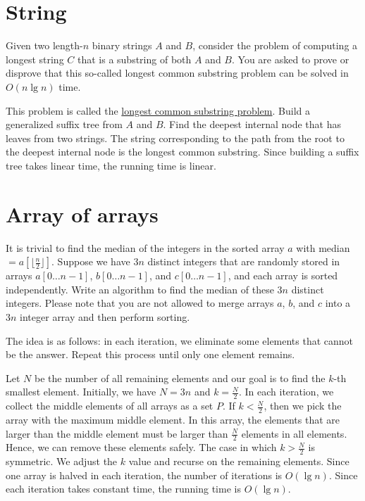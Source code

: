 \section{String}
\begin{Exercise}[origin={NTU CSIE 97},difficulty=1]
Given two length-$n$ binary strings $A$ and $B$, consider the problem of computing a longest string $C$ that is a substring of both $A$ and $B$. You are asked to prove or disprove that this so-called longest common substring problem can be solved in $O(n \lg n)$ time.
\end{Exercise}
\begin{Answer}
This problem is called the \href{https://en.wikipedia.org/wiki/Longest_common_substring_problem}{longest common substring problem}. Build a generalized suffix tree from $A$ and $B$. Find the deepest internal node that has leaves from two strings. The string corresponding to the path from the root to the deepest internal node is the longest common substring. Since building a suffix tree takes linear time, the running time is linear.
\end{Answer}

\section{Array of arrays}

\begin{Exercise}[origin={NTUST CSIE 98},difficulty=1]
It is trivial to find the median of the integers in the sorted array $a$ with median $= a[\lfloor \frac{n}{2} \rfloor]$. Suppose we have $3n$ distinct integers that are randomly stored in arrays $a[0 \dots n-1]$, $b[0 \dots n-1]$, and $c[0 \dots n-1]$, and each array is sorted independently. Write an algorithm to find the median of these $3n$ distinct integers. Please note that you are not allowed to merge arrays $a$, $b$, and $c$ into a $3n$ integer array and then perform sorting. 
\end{Exercise}
\begin{Answer}
The idea is as follows:  in each iteration, we eliminate some elements that cannot be the answer. Repeat this process until only one element remains.

Let $N$ be the number of all remaining elements and our goal is to find the $k$-th smallest element. Initially, we have $N = 3n$ and $k = \frac{N}{2}$. In each iteration, we collect the middle elements of all arrays as a set $P$. If $k < \frac{N}{2}$, then we pick the array with the maximum middle element. In this array, the elements that are larger than the middle element must be larger than $\frac{N}{2}$ elements in all elements. Hence, we can remove these elements safely. The case in which $k > \frac{N}{2}$ is symmetric. We adjust the $k$ value and recurse on the remaining elements. Since one array is halved in each iteration, the number of iterations is $O(\lg n)$. Since each iteration takes constant time, the running time is $O(\lg n)$.
\end{Answer}


